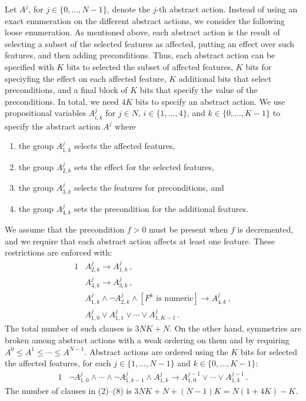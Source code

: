 \documentclass[10pt]{article}
\newcommand{\denselist}{\topsep -1pt \itemsep -1pt}
\begin{document}
Let $A^j$, for $j\in\{0,\ldots,N-1\}$, denote the $j$-th abstract action.
Instead of using an exact enumeration on the different abstract actions,
we consider the following loose enumeration.
As mentioned above, each abstract action is the result of selecting a subset
of the selected features as affected, putting an effect over such features,
and then adding preconditions.
Thus, each abstract action can be specified with $K$ bits to selected the
subset of affected features, $K$ bits for speciyfing the effect on each affected
feature, $K$ additional bits that select preconditions, and a final
block of $K$ bits that specify the value of the preconditions.
In total, we need $4K$ bits to specify an abstract action.
We use propositional variables $A^j_{i,k}$ for $j\in N$, $i\in\{1,\ldots,4\}$,
and $k\in\{0,\ldots,K-1\}$ to specify the abstract action $A^j$ where
\begin{enumerate}[--]\denselist
  \item the group $A^j_{1,k}$ selects the affected features,
  \item the group $A^j_{2,k}$ sets the effect for the selected features,
  \item the group $A^j_{3,k}$ selects the features for preconditions, and
  \item the group $A^j_{4,k}$ sets the precondition for the additional features.
\end{enumerate}
We assume that the precondition $f>0$ must be present when $f$ is decremented,
and we require that each abstract action affects at least one feature.
These restrictions are enforced with:
\begin{alignat}{1}
  &A^j_{2,k} \rightarrow A^j_{1,k} \,, \\
  &A^j_{4,k} \rightarrow A^j_{3,k} \,, \\
  &A^j_{1,k} \land \neg A^j_{2,k} \land [\text{$F^k$ is numeric}] \rightarrow A^j_{4,k} \,, \\
  &A^j_{1,0} \lor A^j_{1,1} \lor \cdots \lor A^j_{1,K-1} \,.
\end{alignat}
The total number of such clauses is $3NK + N$. On the other hand, symmetries
are broken among abstract actions with a weak ordering on them and by
requiring $A^0\leq A^1 \leq \cdots \leq A^{N-1}$. Abstract actions are ordered
using the $K$ bits for selected the affected features, for each $j\in\{1,\ldots,N-1\}$
and $k\in\{0,\ldots,K-1\}$:
\begin{alignat}{1}
  &\neg A^j_{1,0} \land \cdots \land \neg A^j_{1,k-1} \land A^j_{1,k} \rightarrow A^{j-1}_{1,0} \lor \cdots \lor A^{j-1}_{1,k} \,.
\end{alignat}
The number of clauses in (2)--(8) is $3NK + N + (N-1)K = N(1 + 4K) - K$.
\end{document}
